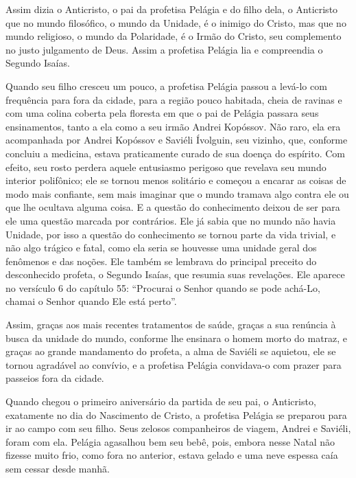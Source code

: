 Assim dizia o Anticristo, o pai da profetisa Pelágia e do filho dela, o
Anticristo que no mundo filosófico, o mundo da Unidade, é o inimigo do
Cristo, mas que no mundo religioso, o mundo da Polaridade, é o Irmão do
Cristo, seu complemento no justo julgamento de Deus. Assim a profetisa
Pelágia lia e compreendia o Segundo Isaías.

Quando seu filho cresceu um pouco, a profetisa Pelágia passou a levá-lo
com frequência para fora da cidade, para a região pouco habitada, cheia
de ravinas e com uma colina coberta pela floresta em que o pai de
Pelágia passara seus ensinamentos, tanto a ela como a seu irmão Andrei
Kopóssov. Não raro, ela era acompanhada por Andrei Kopóssov e Saviéli
Ívolguin, seu vizinho, que, conforme concluiu a medicina, estava
praticamente curado de sua doença do espírito. Com efeito, seu rosto
perdera aquele entusiasmo perigoso que revelava seu mundo interior
polifônico; ele se tornou menos solitário e começou a encarar as coisas
de modo mais confiante, sem mais imaginar que o mundo tramava algo
contra ele ou que lhe ocultava alguma coisa. E a questão do conhecimento
deixou de ser para ele uma questão marcada por contrários. Ele já sabia
que no mundo não havia Unidade, por isso a questão do conhecimento se
tornou parte da vida trivial, e não algo trágico e fatal, como ela seria
se houvesse uma unidade geral dos fenômenos e das noções. Ele também se
lembrava do principal preceito do desconhecido profeta, o Segundo
Isaías, que resumia suas revelações. Ele aparece no versículo 6 do
capítulo 55: ``Procurai o Senhor quando se pode achá-Lo, chamai o Senhor
quando Ele está perto''.

Assim, graças aos mais recentes tratamentos de saúde, graças a sua
renúncia à busca da unidade do mundo, conforme lhe ensinara o homem
morto do matraz, e graças ao grande mandamento do profeta, a alma de
Saviéli se aquietou, ele se tornou agradável ao convívio, e a profetisa
Pelágia convidava-o com prazer para passeios fora da cidade.

Quando chegou o primeiro aniversário da partida de seu pai, o
Anticristo, exatamente no dia do Nascimento de Cristo, a profetisa
Pelágia se preparou para ir ao campo com seu filho. Seus zelosos
companheiros de viagem, Andrei e Saviéli, foram com ela. Pelágia
agasalhou bem seu bebê, pois, embora nesse Natal não fizesse muito frio,
como fora no anterior, estava gelado e uma neve espessa caía sem cessar
desde manhã.

